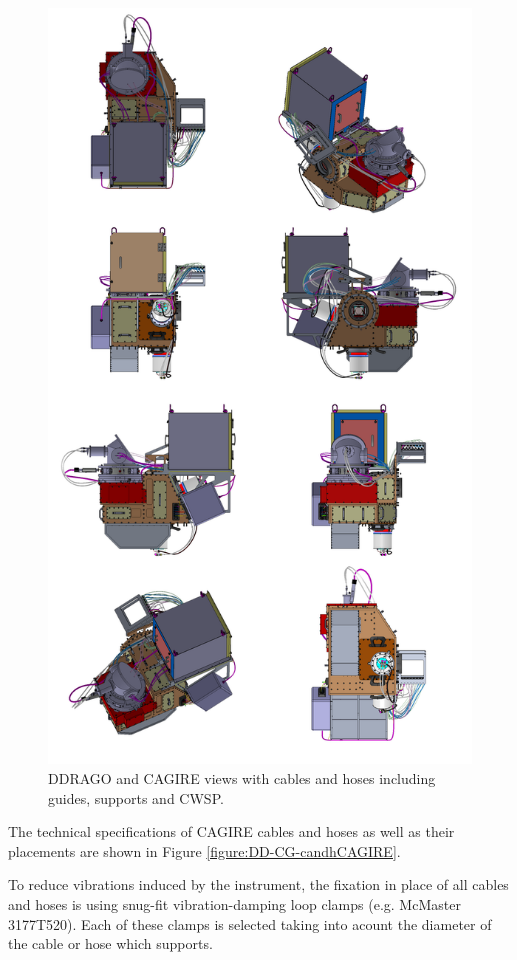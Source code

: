 \documentclass{report}
\begin{document}
\begin{figure}
\begin{center}
\includegraphics[width=0.7\linewidth]{figures/DD-Cg-ME-SS-Cabling-details.png}
\end{center}
\caption{DDRAGO and CAGIRE views with cables and hoses including guides, supports and CWSP.}
\label{figure:DD-CG-candhCWSP}
\end{figure}

The technical specifications of CAGIRE cables and hoses as well as their placements are shown in Figure \ref{figure:DD-CG-candhCAGIRE}.

To reduce vibrations induced by the instrument, the fixation in place of all cables and hoses is using  snug-fit vibration-damping loop clamps (e.g. McMaster 3177T520). Each of these clamps is selected taking into acount the diameter of the cable or hose which supports.
\end{document}
